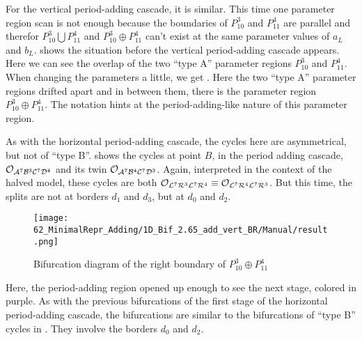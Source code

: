For the vertical period-adding cascade, it is similar.
This time one parameter region scan is not enough because the boundaries of $P_{10}^3$ and $P_{11}^4$ are parallel and therefor $P_{10}^3 \bigcup P_{11}^4$ and $P_{10}^3 \oplus P_{11}^4$ can't exist at the same parameter values of $a_L$ and $b_L$.
 shows the situation before the vertical period-adding cascade appears.
Here we can see the overlap of the two ``type A'' parameter regions $P_{10}^3$ and $P_{11}^4$.
When changing the parameters a little, we get .
Here the two ``type A'' parameter regions drifted apart and in between them, there is the parameter region $P_{10}^3 \oplus P_{11}^4$.
The notation hints at the period-adding-like nature of this parameter region.

As with the horizontal period-adding cascade, the cycles here are asymmetrical, but not of ``type B''.
 shows the cycles at point $B$, in the period adding cascade, $\mathcal{O}_{\mathcal{A}^7\mathcal{B}^3\mathcal{C}^7\mathcal{D}^4}$ and its twin $\mathcal{O}_{\mathcal{A}^7\mathcal{B}^4\mathcal{C}^7\mathcal{D}^3}$.
Again, interpreted in the context of the halved model, these cycles are both $\mathcal{O}_{\mathcal{L}^7\mathcal{R}^3\mathcal{L}^7\mathcal{R}^4} \equiv \mathcal{O}_{\mathcal{L}^7\mathcal{R}^4\mathcal{L}^7\mathcal{R}^3}$.
But this time, the splits are not at borders $d_1$ and $d_3$, but at $d_0$ and $d_2$.

\begin{figure}
    \centering
    \texttt{[image: 62\_MinimalRepr\_Adding/1D\_Bif\_2.65\_add\_vert\_BR/Manual/result.png]}
    \caption{Bifurcation diagram of the right boundary of $P_{10}^3 \oplus P_{11}^4$}
    \label{fig:minrep.add.app.vert.bif.BR}
\end{figure}

Here, the period-adding region opened up enough to see the next stage, colored in purple.
As with the previous bifurcations of the first stage of the horizontal period-adding cascade, the bifurcations are similar to the bifurcations of ``type B'' cycles in .
They involve the borders $d_0$ and $d_2$.

